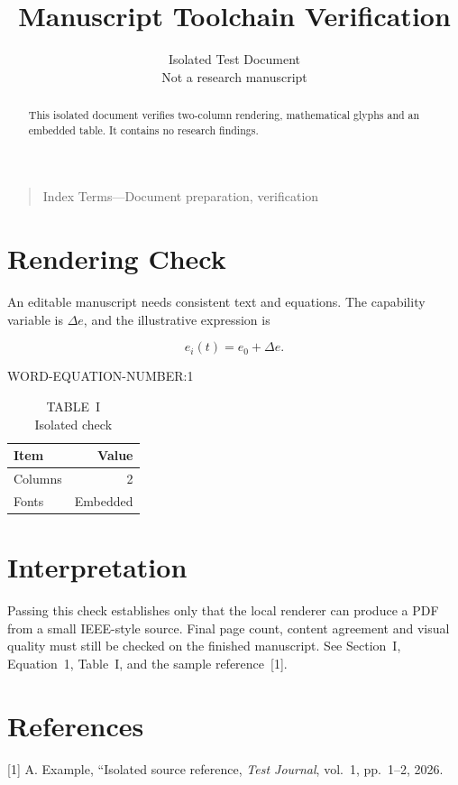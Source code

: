 \documentclass[conference,a4paper]{IEEEtran}
\newcommand{\IEEEauthorblockN}[1]{#1\\}
\newcommand{\IEEEauthorblockA}[1]{#1}
\begin{document}
\title{Manuscript Toolchain Verification}
\author{\IEEEauthorblockN{Isolated Test Document}\IEEEauthorblockA{Not a research manuscript}}
\maketitle
\begin{abstract}This isolated document verifies two-column rendering, mathematical glyphs and an embedded table. It contains no research findings.\end{abstract}
\begin{quote}Index Terms---Document preparation, verification\end{quote}
\section{Rendering Check}\label{sec:check}
An editable manuscript needs consistent text and equations. The capability variable is $\Delta e$, and the illustrative expression is


\[ e_i(t)=e_0+\Delta e.\]

WORD-EQUATION-NUMBER:1


\begin{table}[h]\centering\caption{TABLE~I\\ Isolated check}\begin{tabular}{lr}\toprule Item&Value\\\midrule Columns&2\\Fonts&Embedded\\\bottomrule\end{tabular}\end{table}
\section{Interpretation}
Passing this check establishes only that the local renderer can produce a PDF from a small IEEE-style source. Final page count, content agreement and visual quality must still be checked on the finished manuscript.
See Section~I, Equation~1, Table~I, and the sample reference~[1].
\section*{References}

[1] A. Example, ``Isolated source reference, \emph{Test Journal}, vol.~1, pp.~1--2, 2026.
\end{document}
